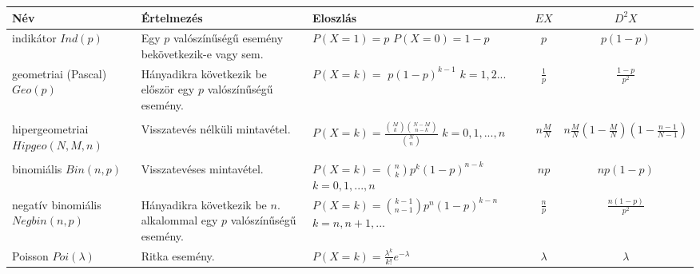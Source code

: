 \documentclass[tikz,12pt,margin=0px]{article}
\newcommand\ddfrac[2]{\frac{\displaystyle #1}{\displaystyle #2}}
\begin{document}
	\noindent \begin{tabular}{|p{3.0cm}|p{4cm}|p{4cm}|c|c|}
		\hline \textbf{Név} & \textbf{Értelmezés} & \textbf{Eloszlás} & \textbf{$EX$} & \textbf{$D^{2}X$} \\
		\hline indikátor \newline $Ind(p)$ & Egy $p$ valószínűségű esemény bekövetkezik-e vagy sem. & $P(X=1) = p$ \newline $P(X=0) = 1-p$ & $p$ & $p(1-p)$ \\
		\hline geometriai (Pascal) \newline $Geo(p)$ & Hányadikra következik be először egy $p$ valószínűségű esemény. &  \newline $k=1,2...$ & $\ddfrac{1}{p}$ & $\ddfrac{1-p}{p^2}$\\
        \hline {} \\
		\hline hipergeometriai \newline $Hipgeo(N,M,n)$ & Visszatevés nélküli mintavétel. & $P(X=k) = \ddfrac{{M \choose k}{N-M \choose n-k}}{{N \choose n}}$ \newline $k=0,1,...,n$ & $n \ddfrac{M}{N}$ & $n \ddfrac{M}{N}(1 - \ddfrac{M}{N})(1 - \ddfrac{n-1}{N-1})$ \\
        \hline {}\\
		\hline binomiális \newline $Bin(n,p)$ & Visszatevéses mintavétel. & $P(X=k) = {n \choose k}p^{k}(1-p)^{n-k}$ \newline $k=0,1,...,n$ & $np$ & $np(1-p)$ \\
		\hline negatív binomiális \newline $Negbin(n,p)$ & Hányadikra következik be $n.$ alkalommal egy $p$ valószínűségű esemény. & $P(X=k) = {k-1 \choose n-1}p^{n}(1-p)^{k-n}$ \newline $k=n,n+1,...$ & $\ddfrac{n}{p}$ & $\ddfrac{n(1-p)}{p^{2}}$ \\
		\hline Poisson \newline $Poi(\lambda)$ & Ritka esemény. & $P(X=k) = \ddfrac{\lambda^k}{k!}e^{-\lambda}$ & $\lambda$ & $\lambda$ \\
		\hline
	\end{tabular}\\ \\
\end{document}
